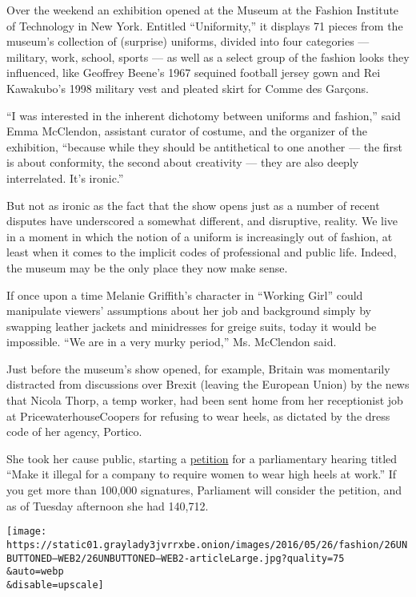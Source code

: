 Over the weekend an exhibition opened at the Museum at the Fashion
Institute of Technology in New York. Entitled ``Uniformity,'' it
displays 71 pieces from the museum's collection of (surprise) uniforms,
divided into four categories --- military, work, school, sports --- as
well as a select group of the fashion looks they influenced, like
Geoffrey Beene's 1967 sequined football jersey gown and Rei Kawakubo's
1998 military vest and pleated skirt for Comme des Garçons.

``I was interested in the inherent dichotomy between uniforms and
fashion,'' said Emma McClendon, assistant curator of costume, and the
organizer of the exhibition, ``because while they should be antithetical
to one another --- the first is about conformity, the second about
creativity --- they are also deeply interrelated. It's ironic.''

But not as ironic as the fact that the show opens just as a number of
recent disputes have underscored a somewhat different, and disruptive,
reality. We live in a moment in which the notion of a uniform is
increasingly out of fashion, at least when it comes to the implicit
codes of professional and public life. Indeed, the museum may be the
only place they now make sense.

If once upon a time Melanie Griffith's character in ``Working Girl''
could manipulate viewers' assumptions about her job and background
simply by swapping leather jackets and minidresses for greige suits,
today it would be impossible. ``We are in a very murky period,'' Ms.
McClendon said.

Just before the museum's show opened, for example, Britain was
momentarily distracted from discussions over Brexit (leaving the
European Union) by the news that Nicola Thorp, a temp worker, had been
sent home from her receptionist job at PricewaterhouseCoopers for
refusing to wear heels, as dictated by the dress code of her agency,
Portico.

She took her cause public, starting a
\href{https://petition.parliament.uk/petitions/129823}{petition} for a
parliamentary hearing titled ``Make it illegal for a company to require
women to wear high heels at work.'' If you get more than 100,000
signatures, Parliament will consider the petition, and as of Tuesday
afternoon she had 140,712.

\texttt{[image: https://static01.graylady3jvrrxbe.onion/images/2016/05/26/fashion/26UNBUTTONED--WEB2/26UNBUTTONED--WEB2-articleLarge.jpg?quality=75\\\&auto=webp\\\&disable=upscale]}

